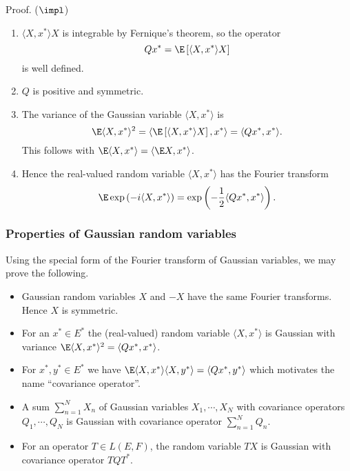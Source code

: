 \begin{frame}
    Proof. ($ \impl $)

    \begin{enumerate}
        \item $ \langle X, x^* \rangle X$ is integrable by Fernique's theorem, so
            the operator
            \begin{equation*}
                Q x^* = \E \left[ \langle X, x^* \rangle X \right] 
            \end{equation*}
            is well defined. 
        \item $Q$ is positive and symmetric. 
        \item The variance of the Gaussian variable $\langle X, x^* \rangle$ is 
            \begin{equation*}
                \E \langle X,x^* \rangle^2 = 
                \langle \E \left[ \langle X,x^* \rangle X \right], x^* \rangle = 
                \langle Qx^*, x^* \rangle.
            \end{equation*}
            This follows with $\E \langle X,x^* \rangle = \langle  \E X, x^* \rangle$.
        \item Hence the real-valued random variable $\langle X, x^* \rangle$
            has the Fourier transform
            \begin{equation*}
                \E \exp \left( -i \langle X,x^* \rangle \right) = 
                \exp \left( -\frac{1}{2} \langle Qx^*,x^* \rangle \right).
            \end{equation*}
    \end{enumerate}
\end{frame}


\begin{frame}
    \frametitle{Properties of Gaussian random variables}
   
    Using the special form of the Fourier transform of Gaussian variables, we
    may prove the following. 

    \begin{itemize}
        \item Gaussian random variables $X$ and $-X$ have the same Fourier transforms. 
            Hence $X$ is symmetric. 
        \item For an $x^*\in E^*$ the (real-valued) random variable 
            $\langle X, x^* \rangle $ is Gaussian with variance 
            $\E \langle X, x^* \rangle^2 = \langle Qx^*, x^* \rangle$. 
        \item For $x^*, y^* \in E^*$ we have 
            $\E \langle X,x^* \rangle \langle X, y^* \rangle = \langle Qx^*, y^* \rangle$ which 
            motivates the name ``covariance operator''. 
        \item A sum $\sum_{n=1}^{N} X_n$ of Gaussian variables $X_1, \cdots , X_N$ with
            covariance operators $Q_1, \cdots , Q_N$ is Gaussian with covariance
            operator $\sum_{n=1}^{N} Q_n$.  
        \item For an operator $T\in L(E, F)$, the random variable $TX$ is Gaussian 
            with covariance operator $TQT^*$. 
    \end{itemize}
\end{frame}


